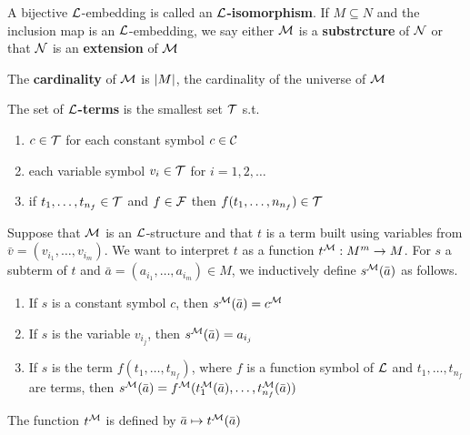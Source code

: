 \documentclass[11pt]{article}
\begin{document}
A bijective \(\mathcal{L}\)-embedding is called an \textbf{\(\mathcal{L}\)-isomorphism}. If
\(M\subseteq N\) and the inclusion map is an \(\mathcal{L}\)-embedding, we say either
\(\mathcal{M}\) is a \textbf{substrcture} of \(\mathcal{N}\) or that \(\mathcal{N}\) is an \textbf{extension}
of \(\mathcal{M}\)

The \textbf{cardinality} of \(\mathcal{M}\) is \(\abs{M}\), the cardinality of the universe of \(\mathcal{M}\)

\begin{definition}[]
The set of \textbf{\(\mathcal{L}\)-terms} is the smallest set \(\mathcal{T}\) s.t.
\begin{enumerate}
\item \(c\in\mathcal{T}\) for each constant symbol \(c\in\mathcal{C}\)
\item each variable symbol \(v_i\in\mathcal{T}\) for \(i=1,2,\dots\)
\item if \(t_1,\dots,t_{n_f}\in\mathcal{T}\) and \(f\in\mathcal{F}\) then
\(f(t_1,\dots,n_{n_f})\in\mathcal{T}\)
\end{enumerate}
\end{definition}


Suppose that \(\mathcal{M}\) is an \(\mathcal{L}\)-structure and that \(t\) is a term built
using variables from \(\bar{v}=(v_{i_1},\dots,v_{i_m})\). We want to interpret
\(t\) as a function \(t^{\mathcal{M}}:M^m\to M\). For \(s\) a subterm of \(t\) and
\(\bar{a}=(a_{i_1},\dots,a_{i_m})\in M\), we inductively define
\(s^{\mathcal{M}}(\bar{a})\) as follows.
\begin{enumerate}
\item If \(s\) is a constant symbol \(c\), then \(s^{\mathcal{M}}(\bar{a})=c^{\mathcal{M}}\)
\item If \(s\) is the variable \(v_{i_j}\), then \(s^{\mathcal{M}}(\bar{a})=a_{i_j}\)
\item If \(s\) is the term \(f(t_1,\dots,t_{n_f})\), where \(f\) is a function symbol
of \(\mathcal{L}\) and \(t_1,\dots,t_{n_f}\) are terms, then 
\(s^{\mathcal{M}}(\bar{a})=f^{\mathcal{M}}(t^{\mathcal{M}}_1(\bar{a}),\dots,t_{n_f}^{\mathcal{M}}(\bar{a}))\)
\end{enumerate}


The function \(t^{\mathcal{M}}\) is defined by \(\bar{a}\mapsto t^{\mathcal{M}}(\bar{a})\)
\end{document}
